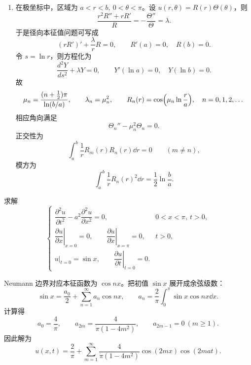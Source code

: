 \begin{question}[回答以下问题]
\begin{solution}
\begin{enumerate}[label=(\arabic*),leftmargin=2.6em,itemsep=0.25em,topsep=0.2em]
\item 在极坐标中，区域为 $a<r<b,\ 0<\theta<\pi$。设 $u(r,\theta)=R(r)\Theta(\theta)$，则
\[
\frac{r^2R''+rR'}{R}=-\frac{\Theta''}{\Theta}=\lambda.
\]
于是径向本征值问题可写成
\[
(rR')'+\frac{\lambda}{r}R=0,
\qquad R'(a)=0,\quad R(b)=0.
\]
令 $s=\ln r$，则方程化为
\[
\frac{d^2Y}{ds^2}+\lambda Y=0,
\qquad Y'(\ln a)=0,\quad Y(\ln b)=0.
\]
故
\[
\mu_n=\frac{(n+\tfrac12)\pi}{\ln(b/a)},
\qquad \lambda_n=\mu_n^2,
\qquad R_n(r)=\cos\Bigl(\mu_n\ln\frac{r}{a}\Bigr),
\quad n=0,1,2,\dots
\]
相应角向满足
\[
\Theta_n''-\mu_n^2\Theta_n=0.
\]
正交性为
\[
\int_a^b \frac{1}{r}R_m(r)R_n(r)\dd{r}=0\qquad (m\ne n),
\]
模方为
\[
\int_a^b \frac{1}{r}R_n(r)^2\dd{r}=\frac12\ln\frac{b}{a}.
\]
\end{enumerate}


\end{solution}
\end{question}

\begin{question}[定解问题（三）]

求解
\[
\begin{cases}
\dfrac{\partial^2u}{\partial t^2}-a^2\dfrac{\partial^2u}{\partial x^2}=0,
&0<x<\pi,\ t>0,\\
\left.\dfrac{\partial u}{\partial x}\right|_{x=0}=0,
\qquad \left.\dfrac{\partial u}{\partial x}\right|_{x=\pi}=0,
&t>0,\\
u|_{t=0}=\sin x,
\qquad \left.\dfrac{\partial u}{\partial t}\right|_{t=0}=0.
\end{cases}
\]

\begin{solution}

Neumann 边界对应本征函数为 $\cos nx$。把初值 $\sin x$ 展开成余弦级数：
\[
\sin x=\frac{a_0}{2}+\sum_{n=1}^{\infty}a_n\cos nx,
\qquad
 a_n=\frac{2}{\pi}\int_0^{\pi}\sin x\cos nx\dd{x}.
\]
计算得
\[
 a_0=\frac{4}{\pi},
 \qquad a_{2m}=\frac{4}{\pi(1-4m^2)},
 \qquad a_{2m-1}=0\ (m\ge1).
\]
因此解为
\[
 u(x,t)=\frac{2}{\pi}+
 \sum_{m=1}^{\infty}\frac{4}{\pi(1-4m^2)}
 \cos(2mx)\cos(2ma t).
\]


\end{solution}
\end{question}

